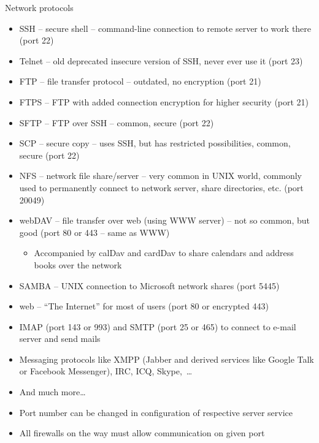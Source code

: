 \documentclass[compress, ucs, xelatex, 11pt, xcolor=svgnames,
  hyperref={
    bookmarks=true,
    unicode=true,
    colorlinks=true,
    pdftitle={Linux, command line and MetaCentrum},
    plainpages=false,
    pdfauthor={Vojtech Zeisek},
    pdfsubject={Course about use of Linux command line, writing shell scripts and using MetaCentrum of CESNET},
    pdfcreator={XeLaTeX},
    pdfkeywords={Linux, GNU, BASH, shell, command line, MetaCentrum},
    linkcolor=DarkRed,
    anchorcolor=DarkBlue,
    citecolor=Indigo,
    filecolor=NavyBlue,
    menucolor=DarkMagenta,
    urlcolor=DarkBlue,
    pdftex},
  url={hyphens, lowtilde} %
  ]{beamer}
\begin{document}
\begin{frame}[allowframebreaks]{Network protocols}
  \begin{itemize}
    \item SSH -- secure shell -- command-line connection to remote server to work there (port 22)
    \item Telnet -- old deprecated insecure version of SSH, never ever use it (port 23)
    \item FTP -- file transfer protocol -- outdated, no encryption (port 21)
    \item FTPS -- FTP with added connection encryption for higher security (port 21)
    \item SFTP -- FTP over SSH -- common, secure (port 22)
    \item SCP -- secure copy -- uses SSH, but has restricted possibilities, common, secure (port 22)
    \item NFS -- network file share/server -- very common in UNIX world, commonly used to permanently connect to network server, share directories, etc. (port 20049)
    \item webDAV -- file transfer over web (using WWW server) -- not so common, but good (port 80 or 443 -- same as WWW)
    \begin{itemize}
      \item Accompanied by calDav and cardDav to share calendars and address books over the network
    \end{itemize}
    \item SAMBA -- UNIX connection to Microsoft network shares (port 5445)
    \item web -- ``The Internet'' for most of users (port 80 or encrypted 443)
    \item IMAP (port 143 or 993) and SMTP (port 25 or 465) to connect to e-mail server and send mails
    \item Messaging protocols like XMPP (Jabber and derived services like Google Talk or Facebook Messenger), IRC, ICQ, Skype,~\ldots
    \item And much more\ldots
    \item Port number can be changed in configuration of respective server service
    \item All firewalls on the way must allow communication on given port
  \end{itemize}
\end{frame}
\end{document}
